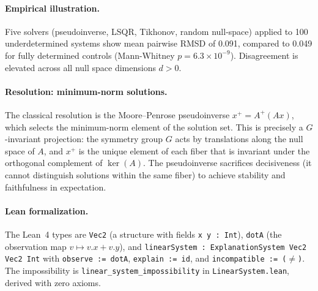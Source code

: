 \paragraph{Empirical illustration.}
Five solvers (pseudoinverse, LSQR, Tikhonov, random null-space) applied to 100
underdetermined systems show mean pairwise RMSD of 0.091, compared to 0.049 for
fully determined controls (Mann-Whitney $p = 6.3 \times 10^{-9}$).  Disagreement is elevated across all null space
dimensions $d > 0$.

\paragraph{Resolution: minimum-norm solutions.}
The classical resolution is the Moore--Penrose pseudoinverse
$x^+ = A^+(Ax)$, which selects the minimum-norm element of the solution
set.  This is precisely a $G$-invariant projection: the symmetry group
$G$ acts by translations along the null space of $A$, and $x^+$ is the unique
element of each fiber that is invariant under the orthogonal complement of
$\ker(A)$.  The pseudoinverse sacrifices decisiveness (it cannot distinguish
solutions within the same fiber) to achieve stability and faithfulness
in expectation.

\paragraph{Lean formalization.}
The Lean~4 types are \texttt{Vec2} (a structure with fields \texttt{x y : Int}),
\texttt{dotA} (the observation map $v \mapsto v.x + v.y$), and
\texttt{linearSystem : ExplanationSystem Vec2 Vec2 Int} with
\texttt{observe := dotA}, \texttt{explain := id}, and
\texttt{incompatible := ($\ne$)}.
The impossibility is \texttt{linear\_system\_impossibility} in
\texttt{LinearSystem.lean}, derived with zero axioms.
